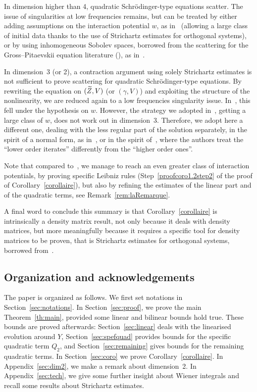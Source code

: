 \documentclass[AHL, Unicode, longabstracts,published]{cedram}
\let\oldtilde\tilde
\renewcommand*{\tilde}[1]{\mathchoice{\widetilde{#1}}{\widetilde{#1}}{\oldtilde{#1}}{\oldtilde{#1}}}
\begin{document}
In dimension higher than 4, quadratic Schr\"odinger-type equations scatter. The issue of singularities at low frequencies remains, but can be treated by either adding assumptions on the interaction potential $w$, as in~\cite{CHP2} (allowing a large class of initial data thanks to the use of Strichartz estimates for orthogonal systems), or by using inhomogeneous Sobolev spaces, borrowed from the scattering for the Gross--Pitaevskii equation literature (\cite{GNT}), as in~\cite{CodS}.

In dimension~3 (or 2), a contraction argument using solely Strichartz estimates is not sufficient to prove scattering for quadratic Schr\"odinger-type equations. By rewriting the equation on $(\tilde Z,V)$ (or $(\gamma,V)$) and exploiting the structure of the nonlinearity, we are reduced again to a low frequencies singularity issue. In~\cite{CHP2}, this fell under the hypothesis on $w$. However, the strategy we adopted in~\cite{CodS}, getting a large class of $w$, does not work out in dimension~3. Therefore, we adopt here a different one, dealing with the less regular part of the solution separately, in the spirit of a normal form, as in~\cite{GHN,GNT2,GNT3}, or in the spirit of~\cite{lewsab2}, where the authors treat the ``lower order iterates'' differently from the ``higher order ones''.

Note that compared to~\cite{CodS}, we manage to reach an even greater class of interaction potentials, by proving specific Leibniz rules (Step~\ref{proofcoro1.2step2} of the proof of Corollary~\ref{corollaire}), but also by refining the estimates of the linear part and of the quadratic terms, see Remark~\ref{rem:laRemarque}.

A final word to conclude this summary is that Corollary~\ref{corollaire} is intrinsically a density matrix result, not only because it deals with density matrices, but more meaningfully because it requires a specific tool for density matrices to be proven, that is Strichartz estimates for orthogonal systems, borrowed from~\cite{FS}.



\subsection{Organization and acknowledgements}

The paper is organized as follows. We first set notations in Section~\ref{sec:notations}. In Section~\ref{sec:proof}, we prove the main Theorem~\ref{th:main}, provided some linear and bilinear bounds hold true. These bounds are proved afterwards: Section~\ref{sec:linear} deals with the linearised evolution around $Y$, Section~\ref{sec:spefquad} provides bounds for the specific quadratic term $Q_2$, and Section~\ref{sec:remaining} gives bounds for the remaining quadratic terms. In Section~\ref{sec:coro} we prove Corollary~\ref{corollaire}. In Appendix~\ref{sec:dim2}, we make a remark about dimension~2. In Appendix~\ref{sec:tech}, we give some further insight about Wiener integrals and recall some results about Strichartz estimates.
\end{document}
